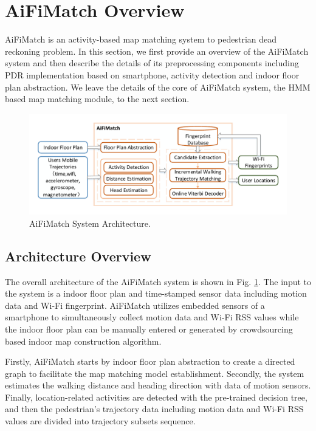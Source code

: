 \documentclass[conference]{IEEEtran}
\begin{document}
\section{AiFiMatch Overview}

AiFiMatch is an activity-based map matching system to pedestrian dead reckoning problem. In this section, we first provide an overview of the AiFiMatch system and then describe the details of its preprocessing components including PDR implementation based on smartphone, activity detection and indoor floor plan abstraction. We leave the details of the core of AiFiMatch system, the HMM based map matching module, to the next section.

\begin{figure}[htbp]
	\centerline{\includegraphics[width=5.235in]{AiFiMatch-Architecture}}
	\caption{AiFiMatch System Architecture.}
	\label{fig-architecture}
	\vspace{-5pt}
\end{figure}

\subsection{Architecture Overview}

The overall architecture of the AiFiMatch system is shown in Fig. \ref{fig-architecture}. The input to the system is a indoor floor plan and time-stamped sensor data including motion data and Wi-Fi fingerprint. AiFiMatch utilizes embedded sensors of a smartphone to simultaneously collect motion data and Wi-Fi RSS values while the indoor floor plan can be manually entered or generated by crowdsourcing based indoor map construction algorithm.

Firstly, AiFiMatch starts by indoor floor plan abstraction to create a directed graph to facilitate the map matching model establishment. Secondly, the system estimates the walking distance and heading direction with data of motion sensors. Finally, location-related activities are detected with the pre-trained decision tree, and then the pedestrian's trajectory data including motion data and Wi-Fi RSS values are divided into trajectory subsets sequence.  
\end{document}
